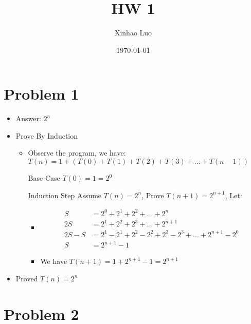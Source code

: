 \documentclass{article}
\title{\bf \Large HW 1}
\author{Xinhao Luo}
\date{\today}
\def\math#1{$#1$}
\begin{document}
\maketitle

\section{Problem 1}

\begin{itemize}
    \item Answer: \math{2^n}
    \item Prove By Induction
        \begin{itemize}
            \item Observe the program, we have: \math{T(n) = 1 + (T(0) + T(1) + T(2) + T(3) + ... + T(n-1))}
            \item [Base Case] \math{T(0) = 1 = 2^0}
            \item [Induction Step] Assume \math{T(n) = 2^n}, Prove \math{T(n+1) = 2^{n+1}}, Let: 
                \begin{itemize}
                    \item 
                        \begin{equation}
                            \begin{split}
                                S &= 2^0 + 2^1 + 2^2 + ... + 2^n \\
                                2S &= 2^1 + 2^2 + 2^3 + ... + 2^{n+1} \\
                                2S - S &= 2^1 - 2^1 + 2^2 - 2^2 + 2^3 - 2^3 + ... + 2^{n+1} - 2^0 \\
                                S &= 2^{n+1} - 1
                            \end{split}
                        \end{equation}
                    \item We have \math{T(n+1) = 1 + 2^{n+1} - 1 = 2^{n+1}}
                \end{itemize}
        \end{itemize}
    \item Proved \math{T(n) = 2^n}
\end{itemize}

\section{Problem 2}
\end{document}
